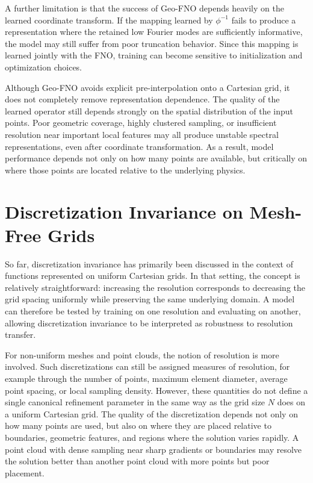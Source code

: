 A further limitation is that the success of Geo-FNO depends heavily on the learned coordinate transform. If the mapping learned by $\phi^{-1}$ fails to produce a representation where the retained low Fourier modes are sufficiently informative, the model may still suffer from poor truncation behavior. Since this mapping is learned jointly with the FNO, training can become sensitive to initialization and optimization choices.

Although Geo-FNO avoids explicit pre-interpolation onto a Cartesian grid, it does not completely remove representation dependence. The quality of the learned operator still depends strongly on the spatial distribution of the input points. Poor geometric coverage, highly clustered sampling, or insufficient resolution near important local features may all produce unstable spectral representations, even after coordinate transformation. As a result, model performance depends not only on how many points are available, but critically on where those points are located relative to the underlying physics.

\section{Discretization Invariance on Mesh-Free Grids} \label{mesh-free-discretization-invariance}

So far, discretization invariance has primarily been discussed in the context of functions represented on uniform Cartesian grids. In that setting, the concept is relatively straightforward: increasing the resolution corresponds to decreasing the grid spacing uniformly while preserving the same underlying domain. A model can therefore be tested by training on one resolution and evaluating on another, allowing discretization invariance to be interpreted as robustness to resolution transfer.

For non-uniform meshes and point clouds, the notion of resolution is more involved. Such discretizations can still be assigned measures of resolution, for example through the number of points, maximum element diameter, average point spacing, or local sampling density. However, these quantities do not define a single canonical refinement parameter in the same way as the grid size \(N\) does on a uniform Cartesian grid. The quality of the discretization depends not only on how many points are used, but also on where they are placed relative to boundaries, geometric features, and regions where the solution varies rapidly. A point cloud with dense sampling near sharp gradients or boundaries may resolve the solution better than another point cloud with more points but poor placement.

